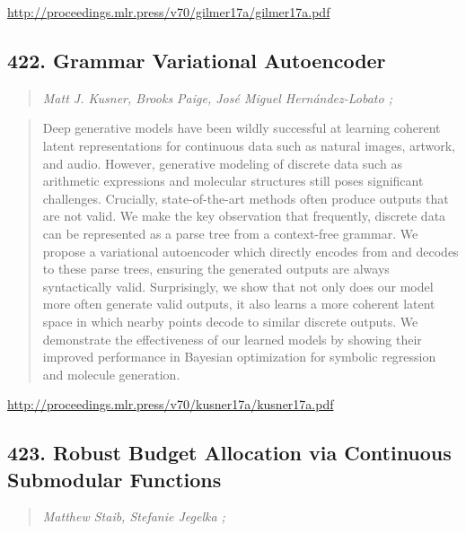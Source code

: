 \documentclass{article}
\begin{document}
\href{http://proceedings.mlr.press/v70/gilmer17a/gilmer17a.pdf}{http://proceedings.mlr.press/v70/gilmer17a/gilmer17a.pdf}

\subsection{422. Grammar Variational Autoencoder}

\begin{quote}
\footnotesize{\textit{Matt J. Kusner, Brooks Paige, José Miguel Hernández-Lobato ;}}

\end{quote}

\begin{quote}
    Deep generative models have been wildly successful at learning coherent latent representations for continuous data such as natural images, artwork, and audio. However, generative modeling of discrete data such as arithmetic expressions and molecular structures still poses significant challenges. Crucially, state-of-the-art methods often produce outputs that are not valid. We make the key observation that frequently, discrete data can be represented as a parse tree from a context-free grammar. We propose a variational autoencoder which directly encodes from and decodes to these parse trees, ensuring the generated outputs are always syntactically valid. Surprisingly, we show that not only does our model more often generate valid outputs, it also learns a more coherent latent space in which nearby points decode to similar discrete outputs. We demonstrate the effectiveness of our learned models by showing their improved performance in Bayesian optimization for symbolic regression and molecule generation.  
\end{quote}

\href{http://proceedings.mlr.press/v70/kusner17a/kusner17a.pdf}{http://proceedings.mlr.press/v70/kusner17a/kusner17a.pdf}

\subsection{423. Robust Budget Allocation via Continuous Submodular Functions}

\begin{quote}
\footnotesize{\textit{Matthew Staib, Stefanie Jegelka ;}}

\end{quote}
\end{document}
